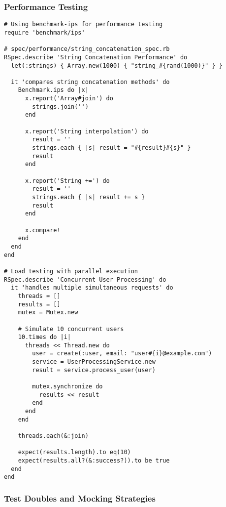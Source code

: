 \documentclass[12pt,a4paper]{article}
\begin{document}
\subsubsection{Performance Testing}

\begin{lstlisting}
# Using benchmark-ips for performance testing
require 'benchmark/ips'

# spec/performance/string_concatenation_spec.rb
RSpec.describe 'String Concatenation Performance' do
  let(:strings) { Array.new(1000) { "string_#{rand(1000)}" } }

  it 'compares string concatenation methods' do
    Benchmark.ips do |x|
      x.report('Array#join') do
        strings.join('')
      end

      x.report('String interpolation') do
        result = ''
        strings.each { |s| result = "#{result}#{s}" }
        result
      end

      x.report('String +=') do
        result = ''
        strings.each { |s| result += s }
        result
      end

      x.compare!
    end
  end
end

# Load testing with parallel execution
RSpec.describe 'Concurrent User Processing' do
  it 'handles multiple simultaneous requests' do
    threads = []
    results = []
    mutex = Mutex.new

    # Simulate 10 concurrent users
    10.times do |i|
      threads << Thread.new do
        user = create(:user, email: "user#{i}@example.com")
        service = UserProcessingService.new
        result = service.process_user(user)
        
        mutex.synchronize do
          results << result
        end
      end
    end

    threads.each(&:join)
    
    expect(results.length).to eq(10)
    expect(results.all?(&:success?)).to be true
  end
end
\end{lstlisting}

\subsubsection{Test Doubles and Mocking Strategies}
\end{document}
